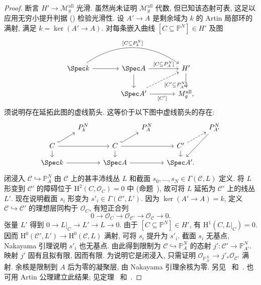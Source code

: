 \begin{proof}
断言 $H'\to\mathcal M_g^{\mathrm{all}}$ 光滑. 虽然尚未证明 $\mathcal M_g^{\mathrm{all}}$ 代数, 但已知该态射可表, 这足以应用无穷小提升判据 () 检验光滑性. 设 $A'\to\allowbreak A$ 是剩余域为 $k$ 的 Artin 局部环的满射, 满足 $k=\ker(A'\to\allowbreak A)$. 对每条嵌入曲线 $[C\subseteq\mathbb P^N]\in H'$ 及图
\begin{equation}\label{src:6.4.7}
\begin{tikzcd}[column sep=large]
\Spec k\arrow[r]\arrow[rr,bend left=35,"{[C\subseteq\mathbb P^N_k]}"]&\Spec A\arrow[r,"{[\mathcal C\subseteq\mathbb P^N_A]}"]\arrow[d]&H'\arrow[d]\\
&\Spec A'\arrow[r,"{[\mathcal C']}"']\arrow[ur,dashed,"{[\mathcal C'\subseteq\mathbb P^N_{A'}]}"']&\mathcal M_g^{\mathrm{all}},
\end{tikzcd}
\end{equation}
须说明存在延拓此图的虚线箭头. 这等价于以下图中虚线箭头的存在:
\[
\begin{tikzcd}[column sep=small,row sep=small]
&\mathbb P^N_k&&\mathbb P^N_A&&\mathbb P^N_{A'}\arrow[ddl]\\
C\arrow[ur,hook]\arrow[rr]\arrow[d]&&\mathcal C\arrow[ur,hook]\arrow[rr]\arrow[d]&&\mathcal C'\arrow[ur,dashed]\arrow[d]&\\
\Spec k\arrow[rr]&&\Spec A\arrow[rr]&&\Spec A'.&
\end{tikzcd}
\]
闭浸入 $\mathcal C\hookrightarrow\mathbb P^N_A$ 由 $\mathcal C$ 上的甚丰沛线丛 $L$ 和截面 $s_0,\allowbreak \ldots,\allowbreak s_N\in\Gamma(\mathcal C,\allowbreak L)$ 定义. 将 $L$ 形变到 $\mathcal C'$ 的障碍位于 $\mathrm H^2(C,\allowbreak \mathcal O_C)=0$ 中 (命题~), 故可将 $L$ 延拓为 $\mathcal C'$ 上的线丛 $L'$. 现在说明截面 $s_i$ 形变为 $s'_i\in\Gamma(\mathcal C',\allowbreak L')$. 因为 $\ker(A'\to\allowbreak A)=k$, 定义 $\mathcal C\hookrightarrow\mathcal C'$ 的理想层同构于 $\mathcal O_C$, 有短正合列
\[
0\to\mathcal O_C\to\mathcal O_{\mathcal C'}\to\mathcal O_{\mathcal C}\to0.
\]
张量 $L'$ 得到 $0\to\allowbreak L|_C\to\allowbreak L'\to\allowbreak L\to0$. 由于 $[C\subseteq\mathbb P^N]\in H'$, 有 $\mathrm H^1(C,\allowbreak L|_C)=0$. 因而 $\mathrm H^0(\mathcal C',\allowbreak L')\to\mathrm H^0(\mathcal C,\allowbreak L)$ 满射, 可将 $s_i$ 提升为 $s'_i$. 截面 $s_i$ 无基点, Nakayama 引理说明 $s'_i$ 也无基点. 由此得到限制为 $\mathcal C\hookrightarrow\mathbb P^N_A$ 的态射 $j':\mathcal C'\to\mathbb P^N_{A'}$. 映射 $j'$ 固有且拟有限, 因而有限. 为说明它是闭浸入, 只需证明 $\mathcal O_{\mathbb P^N_{A'}}\to\allowbreak j'_*\mathcal O_{\mathcal C'}$ 满射. 余核是限制到 $A$ 后为零的凝聚层, 由 Nakayama 引理余核为零. 另见~\cite[定理 B.1]{Hal13} 和~\cite[命题 3.3]{JHS11}. 也可用 Artin 公理建立此结果; 见定理~ 和~\cite[Tag 0D5A]{SP}.
\end{proof}

